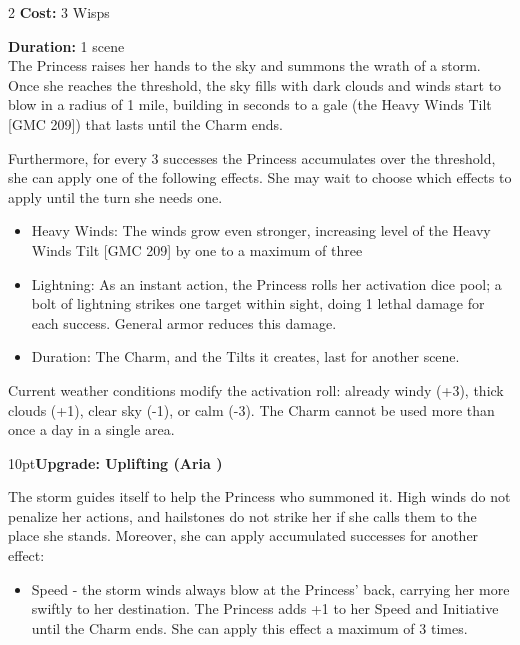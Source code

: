 \begin{multicols}{2}
\noindent \textbf{Cost:} 3 Wisps

\noindent \textbf{Duration:} 1 scene \\

\noindent The Princess raises her hands to the sky and summons the wrath of a storm. Once she reaches the threshold, the sky fills with dark clouds and winds start to blow in a radius of 1 mile, building in seconds to a gale (the Heavy Winds Tilt [GMC 209]) that lasts until the Charm ends. 

Furthermore, for every 3 successes the Princess accumulates over the threshold, she can apply one of the following effects. She may wait to choose which effects to apply until the turn she needs one.

\begin{itemize} 
 \item Heavy Winds: The winds grow even stronger, increasing level of the Heavy Winds Tilt [GMC 209] by one to a maximum of three
 \item Lightning: As an instant action, the Princess rolls her activation dice pool; a bolt of lightning strikes one target within sight, doing 1 lethal damage for each success. General armor reduces this damage.
 \item Duration: The Charm, and the Tilts it creates, last for another scene.\end{itemize}

Current weather conditions modify the activation roll: already windy (+3), thick clouds (+1), clear sky (-1), or calm (-3). The Charm cannot be used more than once a day in a single area.

\begin{myindentpar}{10pt}\textbf{Upgrade: Uplifting (Aria \textbullet\textbullet\textbullet\textbullet)}

The storm guides itself to help the Princess who summoned it. High winds do not penalize her actions, and hailstones do not strike her if she calls them to the place she stands. Moreover, she can apply accumulated successes for another effect:

\begin{itemize}\item    Speed - the storm winds always blow at the Princess' back, carrying her more swiftly to her destination. The Princess adds +1 to her Speed and Initiative until the Charm ends. She can apply this effect a maximum of 3 times.\end{itemize}\end{myindentpar}


\end{multicols}
